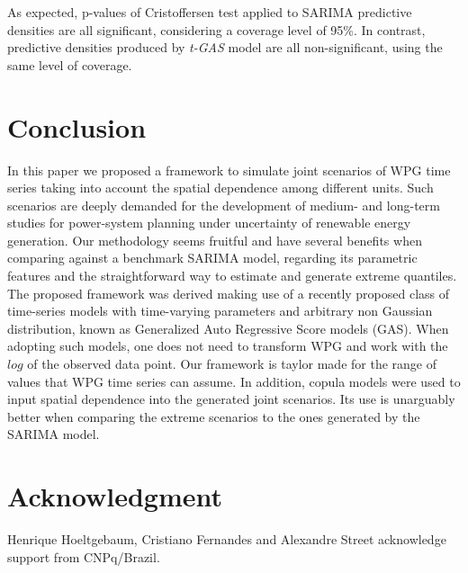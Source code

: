 \documentclass[a4paper]{IEEEtran}
\begin{document}
As expected, p-values of Cristoffersen test applied to SARIMA predictive densities are all significant, considering a coverage level of 95\%. In contrast, predictive densities produced by \emph{t-GAS} model are all non-significant, using the same level of coverage.


\section{Conclusion}\label{Conclusion}

In this paper we proposed a framework to simulate joint scenarios of WPG time series taking into account the spatial dependence among different units. Such scenarios are deeply demanded for the development of medium- and long-term studies for power-system planning under uncertainty of renewable energy generation. Our methodology seems fruitful and have several benefits when comparing against a benchmark SARIMA model, regarding its parametric features and the straightforward way to estimate and generate extreme quantiles. The proposed framework was derived making use of a recently proposed class of time-series models with time-varying parameters and arbitrary non Gaussian distribution, known as Generalized Auto Regressive Score models (GAS). When adopting such models, one does not need to transform WPG and work with the $log$ of the observed data point. Our framework is taylor made for the range of values that WPG time series can assume. In addition, copula models were used to input spatial dependence into the generated joint scenarios. Its use is unarguably better when comparing the extreme scenarios to the ones generated by the SARIMA model.
\section*{Acknowledgment}

Henrique Hoeltgebaum, Cristiano Fernandes and Alexandre Street acknowledge support from CNPq/Brazil.




\end{document}
